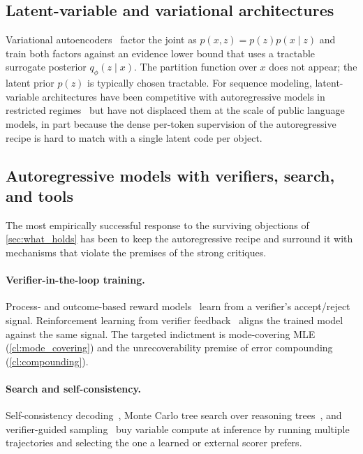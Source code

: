 \subsection{Latent-variable and variational architectures}
\label{ssec:vae}

Variational autoencoders~\citep{kingma2014auto,rezende2014stochastic} factor the joint as $p(x, z) = p(z) p(x \mid z)$ and train both factors against an evidence lower bound that uses a tractable surrogate posterior $q_\phi(z \mid x)$.
The partition function over $x$ does not appear;
the latent prior $p(z)$ is typically chosen tractable.
For sequence modeling, latent-variable architectures have been competitive with autoregressive models in restricted regimes~\citep{razavi2019generating,vahdat2021score} but have not displaced them at the scale of public language models, in part because the dense per-token supervision of the autoregressive recipe is hard to match with a single latent code per object.

\subsection{Autoregressive models with verifiers, search, and tools}
\label{ssec:ar_plus}

The most empirically successful response to the surviving objections of \cref{sec:what_holds} has been to keep the autoregressive recipe and surround it with mechanisms that violate the premises of the strong critiques.
\paragraph{Verifier-in-the-loop training.}
Process- and outcome-based reward models~\citep{lightman2024lets,uesato2022solving,wang2024math} learn from a verifier's accept/reject signal.
Reinforcement learning from verifier feedback~\citep{cobbe2021training,gao2023scaling} aligns the trained model against the same signal.
The targeted indictment is mode-covering MLE (\ref{cl:mode_covering}) and the unrecoverability premise of error compounding (\ref{cl:compounding}).
\paragraph{Search and self-consistency.}
Self-consistency decoding~\citep{wang2023self-consistency}, Monte Carlo tree search over reasoning trees~\citep{yao2023tree,hao2023reasoning,zhang2024rest}, and verifier-guided sampling~\citep{chen2024alphamath} buy variable compute at inference by running multiple trajectories and selecting the one a learned or external scorer prefers.
